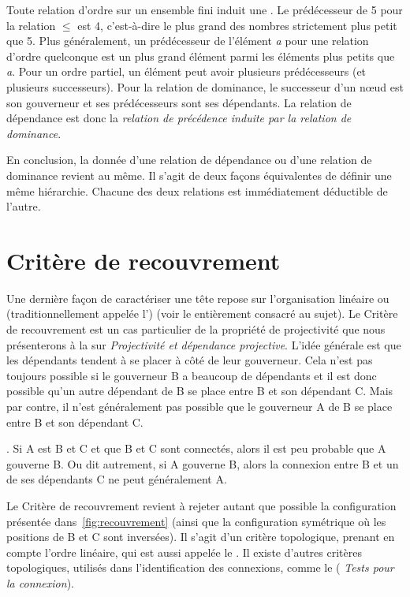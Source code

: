 {    Toute relation d’ordre sur un ensemble fini induit une . Le prédécesseur de 5 pour la relation ${\leq}$ est 4, c’est-à-dire le plus grand des nombres strictement plus petit que 5. Plus généralement, un prédécesseur de l’élément \textit{a} pour une relation d’ordre quelconque est un plus grand élément parmi les éléments plus petits que \textit{a}. Pour un ordre partiel, un élément peut avoir plusieurs prédécesseurs (et plusieurs successeurs). Pour la relation de dominance, le successeur d’un nœud est son gouverneur et ses prédécesseurs sont ses dépendants. La relation de dépendance est donc la \textit{relation de précédence induite par la relation de dominance}.

    En conclusion, la donnée d’une relation de dépendance ou d’une relation de dominance revient au même. Il s’agit de deux façons équivalentes de définir une même hiérarchie. Chacune des deux relations est immédiatement déductible de l’autre.
}

\section{Critère de recouvrement}\label{sec:3.3.32}\largerpage

Une dernière façon de caractériser une tête repose sur l’organisation linéaire ou  (traditionnellement appelée l’) (voir le  entièrement consacré au sujet). Le Critère de recouvrement est un cas particulier de la propriété de projectivité que nous présenterons à la  sur \textit{Projectivité et dépendance projective}. L’idée générale est que les dépendants tendent à se placer à côté de leur gouverneur. Cela n’est pas toujours possible si le gouverneur B a beaucoup de dépendants et il est donc possible qu’un autre dépendant de B se place entre B et son dépendant C. Mais par contre, il n’est généralement pas possible que le gouverneur A de B se place entre B et son dépendant C.

{. Si A est  B et C et que B et C sont connectés, alors il est peu probable que A gouverne B. Ou dit autrement, si A gouverne B, alors la connexion entre B et un de ses dépendants C ne peut généralement  A.}

Le Critère de recouvrement revient à rejeter autant que possible la configuration présentée dans~\ref{fig:recouvrement} (ainsi que la configuration symétrique où les positions de B et C sont inversées). Il s'agit d'un critère topologique, prenant en compte l'ordre linéaire, 
qui est aussi appelée le . Il existe d'autres critères topologiques, utilisés dans l'identification des connexions, comme le  ( \textit{Tests pour la connexion}).

